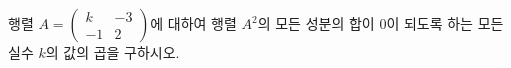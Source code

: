 행렬 $A=\begin{pmatrix} k & -3 \\ -1 & 2 \end{pmatrix}$에 대하여 행렬 $A^2$의 모든 성분의 합이 $0$이 되도록 하는 모든 실수 $k$의 값의 곱을 구하시오.
